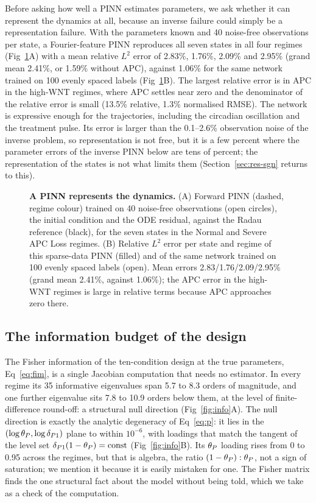 Before asking how well a PINN estimates parameters, we ask whether it can
represent the dynamics at all, because an inverse failure could simply be a
representation failure. With the parameters known and 40 noise-free observations
per state, a Fourier-feature PINN reproduces all seven states in all four regimes
(Fig~\ref{fig:forward}A) with a mean relative $L^2$ error of 2.83\%, 1.76\%,
2.09\% and 2.95\% (grand mean 2.41\%, or 1.59\% without APC), against 1.06\% for
the same network trained on 100 evenly spaced labels (Fig~\ref{fig:forward}B).
The largest relative error is in APC in the high-WNT regimes, where APC settles
near zero and the denominator of the relative error is small (13.5\% relative,
1.3\% normalised RMSE). The network is expressive enough for the trajectories,
including the circadian oscillation and the treatment pulse. Its error is
larger than the 0.1--2.6\% observation noise of the inverse problem, so
representation is not free, but it is a few percent where the parameter errors
of the inverse PINN below are tens of percent; the representation of the states
is not what limits them (Section~\ref{sec:res-sgn} returns to this).

\begin{figure}[tbp]
\centering
{}
\caption{\textbf{A PINN represents the dynamics.} (A) Forward PINN (dashed,
regime colour) trained on 40 noise-free observations (open circles), the initial
condition and the ODE residual, against the Radau reference (black), for the
seven states in the Normal and Severe APC Loss regimes. (B) Relative $L^2$
error per state and regime of this sparse-data PINN (filled) and of the same
network trained on 100 evenly spaced labels (open). Mean errors 2.83/1.76/2.09/2.95\%
(grand mean 2.41\%, against 1.06\%); the APC error in the high-WNT regimes is
large in relative terms because APC approaches zero there.}
\label{fig:forward}
\end{figure}

\subsection{The information budget of the design}
\label{sec:res-budget}

The Fisher information of the ten-condition design at the true parameters,
Eq~\eqref{eq:fim}, is a single Jacobian computation that needs no estimator.
In every regime its 35 informative eigenvalues span 5.7 to 8.3 orders of
magnitude, and one further eigenvalue sits 7.8 to 10.9 orders below them, at the
level of finite-difference round-off: a structural null
direction (Fig~\ref{fig:info}A). The null direction is exactly
the analytic degeneracy of Eq~\eqref{eq:p}: it lies in the $(\log\theta_P,\log\delta_{P1})$
plane to within $10^{-6}$, with loadings that match the tangent of the level
set $\delta_{P1}(1-\theta_P)=\text{const}$ (Fig~\ref{fig:info}B). Its $\theta_P$ loading rises
from 0 to 0.95 across the regimes, but that is algebra, the ratio
$(1-\theta_P):\theta_P$, not a sign of saturation; we mention it because it is easily
mistaken for one. The Fisher matrix finds the one structural fact about the
model without being told, which we take as a check of the computation.

